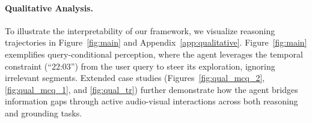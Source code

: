 \documentclass{article}
\theoremstyle{plain}
\theoremstyle{definition}
\theoremstyle{remark}
\begin{document}
\paragraph{Qualitative Analysis.} To illustrate the interpretability of our framework, we visualize reasoning trajectories in Figure~\ref{fig:main} and Appendix~\ref{app:qualitative}.
Figure~\ref{fig:main} exemplifies query-conditional perception, where the agent leverages the temporal constraint (``22:03'') from the user query to steer its exploration, ignoring irrelevant segments.
Extended case studies (Figures~\ref{fig:qual_mcq_2}, \ref{fig:qual_mcq_1}, and \ref{fig:qual_tr}) further demonstrate how the agent bridges information gaps through active audio-visual interactions across both reasoning and grounding tasks.
\end{document}
